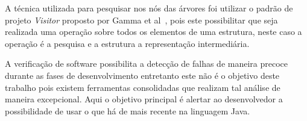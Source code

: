 
A técnica utilizada para pesquisar nos nós das árvores foi utilizar o padrão de projeto \textit{Visitor} proposto por  Gamma et al~\cite{Gamma:1995}, pois este possibilitar que seja realizada uma operação sobre todos os elementos de uma estrutura,  neste caso a operação  é a pesquisa e a estrutura a representação intermediária.


A verificação de software possibilita a detecção de falhas de maneira precoce durante as fases de desenvolvimento entretanto este não é o objetivo deste trabalho pois existem ferramentas consolidadas que realizam tal análise de maneira excepcional. Aqui o objetivo principal é alertar ao desenvolvedor a possibilidade de usar o que há de mais recente na linguagem Java.






